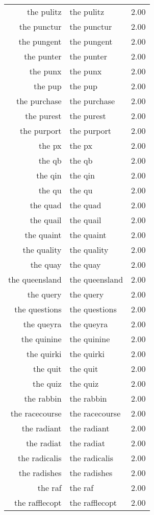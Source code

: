 \begin{table}[ht]
\begin{tabular}{rlr}
  the pulitz & the pulitz & 2.00 \\ 
  the punctur & the punctur & 2.00 \\ 
  the pungent & the pungent & 2.00 \\ 
  the punter & the punter & 2.00 \\ 
  the punx & the punx & 2.00 \\ 
  the pup & the pup & 2.00 \\ 
  the purchase & the purchase & 2.00 \\ 
  the purest & the purest & 2.00 \\ 
  the purport & the purport & 2.00 \\ 
  the px & the px & 2.00 \\ 
  the qb & the qb & 2.00 \\ 
  the qin & the qin & 2.00 \\ 
  the qu & the qu & 2.00 \\ 
  the quad & the quad & 2.00 \\ 
  the quail & the quail & 2.00 \\ 
  the quaint & the quaint & 2.00 \\ 
  the quality & the quality & 2.00 \\ 
  the quay & the quay & 2.00 \\ 
  the queensland & the queensland & 2.00 \\ 
  the query & the query & 2.00 \\ 
  the questions & the questions & 2.00 \\ 
  the queyra & the queyra & 2.00 \\ 
  the quinine & the quinine & 2.00 \\ 
  the quirki & the quirki & 2.00 \\ 
  the quit & the quit & 2.00 \\ 
  the quiz & the quiz & 2.00 \\ 
  the rabbin & the rabbin & 2.00 \\ 
  the racecourse & the racecourse & 2.00 \\ 
  the radiant & the radiant & 2.00 \\ 
  the radiat & the radiat & 2.00 \\ 
  the radicalis & the radicalis & 2.00 \\ 
  the radishes & the radishes & 2.00 \\ 
  the raf & the raf & 2.00 \\ 
  the rafflecopt & the rafflecopt & 2.00 \\ 

\end{tabular}
\end{table}
